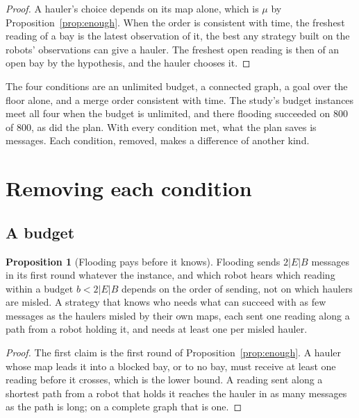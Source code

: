 \documentclass[11pt,a4paper]{article}
\theoremstyle{definition}
\newtheorem{proposition}{Proposition}
\newcommand{\merged}{\mu}
\begin{document}
\begin{proof}
A hauler's choice depends on its map alone, which is $\merged$ by
Proposition~\ref{prop:enough}. When the order is consistent with time, the
freshest reading of a bay is the latest observation of it, the best any strategy
built on the robots' observations can give a hauler. The freshest open reading
is then of an open bay by the hypothesis, and the hauler chooses it.
\end{proof}

The four conditions are an unlimited budget, a connected graph, a goal over the
floor alone, and a merge order consistent with time. The study's budget instances
meet all four when the budget is unlimited, and there flooding succeeded on 800 of
800, as did the plan. With every condition met, what the plan saves is messages.
Each condition, removed, makes a difference of another kind.

\section{Removing each condition}
\label{sec:separations}

\subsection{A budget}

\begin{proposition}[Flooding pays before it knows]
\label{prop:budget}
Flooding sends $2|E|B$ messages in its first round whatever the instance, and
which robot hears which reading within a budget $b < 2|E|B$ depends on the order of
sending, not on which haulers are misled. A strategy that knows who needs what can
succeed with as few messages as the haulers misled by their own maps, each sent one
reading along a path from a robot holding it, and needs at least one per misled
hauler.
\end{proposition}

\begin{proof}
The first claim is the first round of Proposition~\ref{prop:enough}. A hauler whose
map leads it into a blocked bay, or to no bay, must receive at least one reading
before it crosses, which is the lower bound. A reading sent along a shortest path
from a robot that holds it reaches the hauler in as many messages as the path is
long; on a complete graph that is one.
\end{proof}
\end{document}
